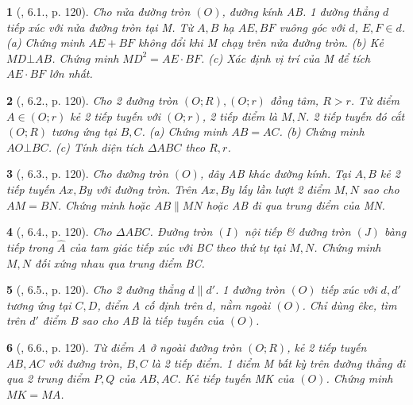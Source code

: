 \documentclass{article}
\newtheorem{baitoan}{}
\begin{document}
\begin{baitoan}[\cite{Binh_boi_duong_Toan_9_tap_1}, 6.1., p. 120]
	Cho nửa đường tròn $(O)$, đường kính AB. 1 đường thẳng $d$ tiếp xúc với nửa đường tròn tại M. Từ $A,B$ hạ $AE,BF$ vuông góc với $d$, $E,F\in d$. (a) Chứng minh $AE + BF$ không đổi khi M chạy trên nửa đường tròn. (b) Kẻ $MD\bot AB$. Chứng minh $MD^2 = AE\cdot BF$. (c) Xác định vị trí của M để tích $AE\cdot BF$ lớn nhất.
\end{baitoan}

\begin{baitoan}[\cite{Binh_boi_duong_Toan_9_tap_1}, 6.2., p. 120]
	Cho 2 đường tròn $(O;R),(O;r)$ đồng tâm, $R > r$. Từ điểm $A\in(O;r)$ kẻ 2 tiếp tuyến với $(O;r)$, 2 tiếp điểm là $M,N$. 2 tiếp tuyến đó cắt $(O;R)$ tương ứng tại $B,C$. (a) Chứng minh $AB = AC$. (b) Chứng minh $AO\bot BC$. (c) Tính diện tích $\Delta ABC$ theo $R,r$.
\end{baitoan}

\begin{baitoan}[\cite{Binh_boi_duong_Toan_9_tap_1}, 6.3., p. 120]
	Cho đường tròn $(O)$, dây AB khác đường kính. Tại $A,B$ kẻ 2 tiếp tuyến $Ax,By$ với đường tròn. Trên $Ax,By$ lấy lần lượt 2 điểm $M,N$ sao cho $AM = BN$. Chứng minh hoặc $AB\parallel MN$ hoặc AB đi qua trung điểm của MN.
\end{baitoan}

\begin{baitoan}[\cite{Binh_boi_duong_Toan_9_tap_1}, 6.4., p. 120]
	Cho $\Delta ABC$. Đường tròn $(I)$ nội tiếp \& đường tròn $(J)$ bàng tiếp trong $\widehat{A}$ của tam giác tiếp xúc với BC theo thứ tự tại $M,N$. Chứng minh $M,N$ đối xứng nhau qua trung điểm BC.
\end{baitoan}

\begin{baitoan}[\cite{Binh_boi_duong_Toan_9_tap_1}, 6.5., p. 120]
	Cho 2 đường thẳng $d\parallel d'$. 1 đường tròn $(O)$ tiếp xúc với $d,d'$ tương ứng tại $C,D$, điểm A cố định trên $d$, nằm ngoài $(O)$. Chỉ dùng êke, tìm trên $d'$ điểm B sao cho AB là tiếp tuyến của $(O)$.
\end{baitoan}

\begin{baitoan}[\cite{Binh_boi_duong_Toan_9_tap_1}, 6.6., p. 120]
	Từ điểm A ở ngoài đường tròn $(O;R)$, kẻ 2 tiếp tuyến $AB,AC$ với đường tròn, $B,C$ là 2 tiếp điểm. 1 điểm M bất kỳ trên đường thẳng đi qua 2 trung điểm $P,Q$ của $AB,AC$. Kẻ tiếp tuyến MK của $(O)$. Chứng minh $MK = MA$.
\end{baitoan}
\end{document}
